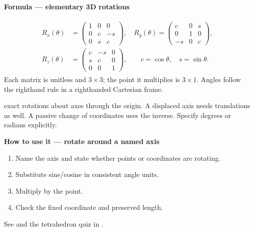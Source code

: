 \documentclass[letterpaper,11pt,english,openany,oneside]{jupyterBook}
\begin{document}
\begin{TextbookBox}
\textbf{Formula — elementary 3D rotations}\par\smallskip
\begin{equation}\label{equation:lectures/lecture01/rotations:eq-lec01-rotation3}
\begin{split}\begin{aligned}
R_x(\theta)&=\begin{pmatrix}1&0&0\\0&c&-s\\0&s&c\end{pmatrix},\quad
R_y(\theta)=\begin{pmatrix}c&0&s\\0&1&0\\-s&0&c\end{pmatrix},\\
R_z(\theta)&=\begin{pmatrix}c&-s&0\\s&c&0\\0&0&1\end{pmatrix},\qquad
c=\cos\theta,\quad s=\sin\theta.
\end{aligned}\end{split}
\end{equation}
\sphinxAtStartPar
Each matrix is unitless and \(3\times3\); the point it multiplies is \(3\times1\). Angles follow the right\sphinxhyphen{}hand rule in a right\sphinxhyphen{}handed Cartesian frame.

\sphinxAtStartPar
{} exact rotations about axes through the origin. A displaced axis needs translations as well. A passive change of coordinates uses the inverse. Specify degrees or radians explicitly.

\end{TextbookBox}

\begin{TextbookBox}
\textbf{How to use it — rotate around a named axis}\par\smallskip
\begin{enumerate}
%
\item {}
\sphinxAtStartPar
Name the axis and state whether points or coordinates are rotating.

\item {}
\sphinxAtStartPar
Substitute sine/cosine in consistent angle units.

\item {}
\sphinxAtStartPar
Multiply by the point.

\item {}
\sphinxAtStartPar
Check the fixed coordinate and preserved length.

\end{enumerate}

\sphinxAtStartPar
See {\hyperref[\detokenize{lectures/lecture01/rotations:ex-lec01-order}]{}} and the tetrahedron quiz in {\hyperref[\detokenize{lectures/lecture01/frames-quizzes:lec01-frames}]{}}.

\end{TextbookBox}
\end{document}
